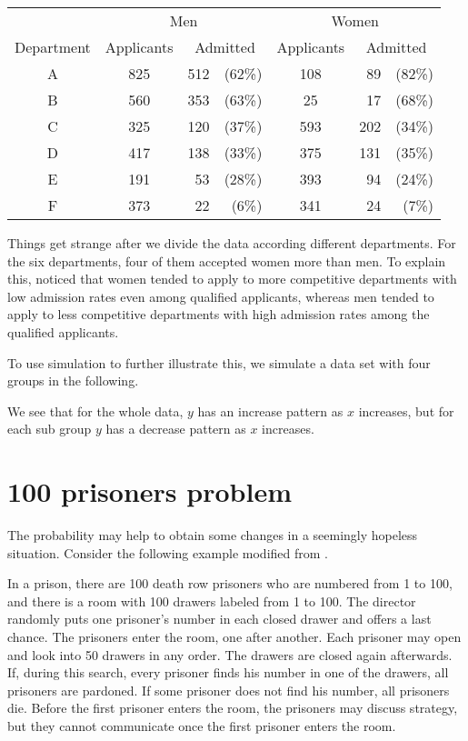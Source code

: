 \begin{table}
  \centering
\begin{tabular}{ccrrcrr}\hline
  & \multicolumn{3}{c}{Men}  & \multicolumn{3}{c}{Women} \\\cline{2-7}
Department & Applicants  & \multicolumn{2}{c}{Admitted} & Applicants  & \multicolumn{2}{c}{Admitted} \\\hline
A & 825 & 512& (62\%) & 108 & 89 &(82\%)  \\ 
B & 560 & 353& (63\%) & 25  & 17 &(68\%)  \\
C & 325 & 120& (37\%) & 593 & 202& (34\%) \\
D & 417 & 138& (33\%) & 375 & 131& (35\%) \\
E & 191 & 53 & (28\%) & 393 & 94 &(24\%)  \\
F & 373 & 22 & (6\%) & 341 & 24 &(7\%)  \\\hline
\end{tabular}
\end{table}

Things get strange after we divide the data according different
departments. For the six departments, four of them accepted women more
than men.  To explain this, \cite{bickel1975sex} noticed that women
tended to apply to more competitive departments with low admission
rates even among qualified applicants, whereas men tended to apply to
less competitive departments with high admission rates among the
qualified applicants.

To use simulation to further illustrate this, we simulate a data set
with four groups in the following.



We see that for the whole data, $y$ has an increase pattern as $x$
increases, but for each sub group $y$ has a decrease pattern as $x$
increases.

\hypertarget{prisoners-problem}{%
\section{100 prisoners problem}\label{prisoners-problem}}

The probability may help to obtain some changes in a seemingly
hopeless situation. Consider the following example modified from
\cite{flajolet2009analytic}.

In a prison, there are 100 death row prisoners who are numbered from 1
to 100, and there is a room with 100 drawers labeled from 1 to
100. The director randomly puts one prisoner's number in each closed
drawer and offers a last chance. The prisoners enter the room, one
after another. Each prisoner may open and look into 50 drawers in any
order. The drawers are closed again afterwards. If, during this
search, every prisoner finds his number in one of the drawers, all
prisoners are pardoned. If some prisoner does not find his number, all
prisoners die. Before the first prisoner enters the room, the
prisoners may discuss strategy, but they cannot communicate once the
first prisoner enters the room.

